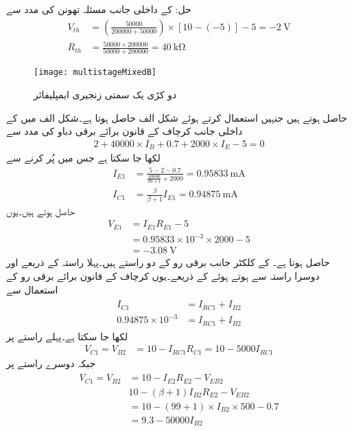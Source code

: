 حل: کے داخلی جانب مسئلہ تھونن کی مدد سے
\begin{align*}
V_{th}&=\left(\frac{50000}{200000+50000}\right) \times \left[10-\left(-5 \right) \right]-5=\SI{-2}{\volt}\\
R_{th}&=\frac{50000 \times 200000}{50000+200000}=\SI{40}{\kilo \ohm}
\end{align*} 
\begin{figure}
\centering
\texttt{[image: multistageMixedB]}
\caption{دو کڑی یک سمتی زنجیری ایمپلیفائر}
\label{شکل_دو_کڑی_زنجیری_یکسمتی_ایمپلیفائر_مثبت_منفی_مثبت_الف}
\end{figure}
حاصل ہوتے ہیں جنہیں استعمال کرتے ہوئے شکل  الف حاصل ہوتا ہے۔شکل  الف میں  کے داخلی جانب کرچاف کے قانون برائے برقی دباو کی مدد سے
\begin{align*}
2+40000\times I_B+0.7+2000\times I_E-5=0
\end{align*}
لکھا جا سکتا ہے جس میں  پُر کرنے سے
\begin{align*}
I_{E1}&=\frac{5-2-0.7}{\frac{40000}{99+1}+2000}=\SI{0.95833}{\milli \ampere}\\
I_{C1}&=\frac{\beta}{\beta+1} I_{E1}=\SI{0.94875}{\milli \ampere}
\end{align*}
حاصل ہوتے ہیں۔یوں 
\begin{align*}
V_{E1}&=I_{E1} R_{E1}-5\\
&=0.95833 \times 10^{-3} \times 2000-5\\
&=\SI{-3.08}{\volt}
\end{align*}
حاصل ہوتا ہے۔ کے کلکٹر  جانب برقی رو  کے دو راستے ہیں۔پہلا راستہ  کے ذریعے اور دوسرا راستہ  سے ہوتے ہوئے  کے ذریعے۔یوں کرچاف کے قانون برائے برقی رو کے استعمال سے
\begin{gather}
\begin{aligned}\label{مساوات_ٹرانزسٹر_مثال_زنجیری_مکس_پہلا}
I_{C1}&=I_{RC1}+I_{B2}\\
0.94875 \times 10^{-3}&=I_{RC1}+I_{B2}
\end{aligned}
\end{gather}
لکھا جا سکتا ہے۔پہلے راستے پر
\begin{align}\label{مساوات_ٹرانزسٹر_مثال_زنجیری_مکس_دوسرا}
V_{C1}=V_{B2}&=10-I_{RC1} R_{C1}=10-5000 I_{RC1}
\end{align}
جبکہ دوسرے راستے پر
\begin{gather}\label{مساوات_ٹرانزسٹر_مثال_زنجیری_مکس_تیسرا}
\begin{aligned}
V_{C1}=V_{B2}&=10-I_{E2}R_{E2}-V_{EB2}\\
&10-\left(\beta+1 \right)I_{B2}R_{E2}-V_{EB2}\\
&=10-\left(99+1 \right) \times I_{B2} \times 500-0.7\\
&=9.3-50000 I_{B2}
\end{aligned}
\end{gather}
